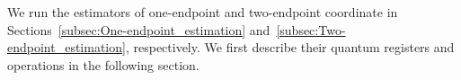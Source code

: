  
We run the estimators of one-endpoint and two-endpoint coordinate in Sections~\ref{subsec:One-endpoint_estimation} and~\ref{subsec:Two-endpoint_estimation}, respectively. 
We first describe their quantum registers and operations in the following section.








